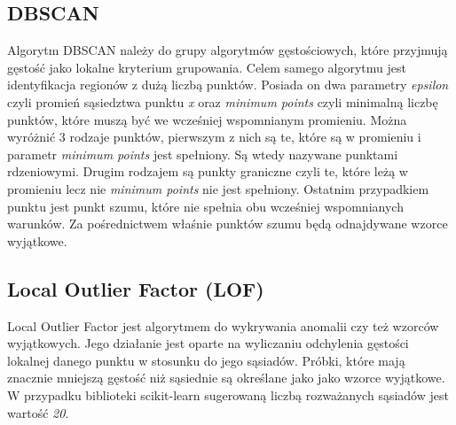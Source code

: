 \documentclass{classrep}
\begin{document}
{        \subsection{DBSCAN} {
            Algorytm DBSCAN należy do grupy algorytmów gęstościowych, które przyjmują
            gęstość jako lokalne kryterium grupowania. Celem samego algorytmu jest
            identyfikacja regionów z dużą liczbą punktów. Posiada on dwa parametry
            \textit{epsilon} czyli promień sąsiedztwa punktu \textit{x} oraz
            \textit{minimum points} czyli minimalną liczbę punktów, które muszą być we
            wcześniej wspomnianym promieniu. Można wyróżnić 3 rodzaje punktów,
            pierwszym z nich są te, które są w promieniu i parametr
            \textit{minimum points} jest spełniony. Są wtedy nazywane punktami
            rdzeniowymi. Drugim rodzajem są punkty graniczne czyli te, które leżą w
            promieniu lecz nie \textit{minimum points} nie jest spełniony. Ostatnim
            przypadkiem punktu jest punkt szumu, które nie spełnia obu wcześniej
            wspomnianych warunków. Za pośrednictwem właśnie punktów szumu będą
            odnajdywane wzorce wyjątkowe.
        }

        \subsection{Local Outlier Factor (LOF)} {
            Local Outlier Factor jest algorytmem do wykrywania anomalii czy też wzorców
            wyjątkowych. Jego działanie jest oparte na wyliczaniu odchylenia
            gęstości lokalnej danego punktu w stosunku do jego sąsiadów. Próbki, które
            mają znacznie mniejszą gęstość niż sąsiednie są określane jako jako
            wzorce wyjątkowe. W przypadku biblioteki scikit-learn\cite{sklearn}
            sugerowaną liczbą rozważanych sąsiadów jest wartość \textit{20}.
        }
    }
\end{document}
